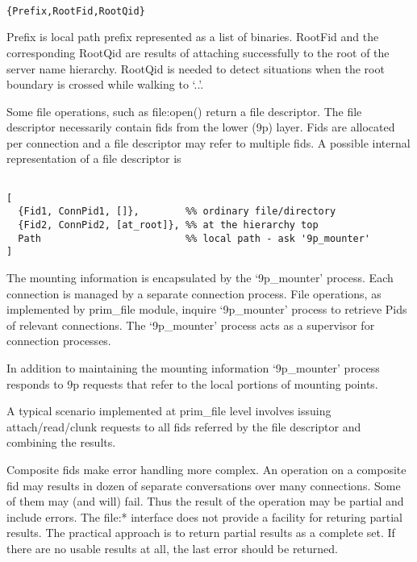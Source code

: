 \begin{adjustwidth}{2.5em}{2.5em}
\begin{verbatim}

{Prefix,RootFid,RootQid}

\end{verbatim}
\end{adjustwidth}

Prefix is local path prefix represented as a list of binaries. RootFid and the
corresponding RootQid are results of attaching successfully to the root of the
server name hierarchy. RootQid is needed to detect situations when the root
boundary is crossed while walking to `..'.

Some file operations, such as file:open() return a file descriptor. The
file descriptor necessarily contain fids from the lower (9p) layer. Fids are
allocated per connection and a file descriptor may refer to multiple fids. A
possible internal representation of a file descriptor is

\begin{adjustwidth}{2.5em}{2.5em}
\begin{verbatim}

[
  {Fid1, ConnPid1, []},        %% ordinary file/directory
  {Fid2, ConnPid2, [at_root]}, %% at the hierarchy top
  Path                         %% local path - ask '9p_mounter'
]

\end{verbatim}
\end{adjustwidth}

The mounting information is encapsulated by the `9p\_mounter' process. Each
connection is managed by a separate connection process. File operations, as
implemented by prim\_file module, inquire `9p\_mounter' process to retrieve Pids
of relevant connections. The `9p\_mounter' process acts as a supervisor for
connection processes.

In addition to maintaining the mounting information `9p\_mounter' process
responds to 9p requests that refer to the local portions of mounting points.

A typical scenario implemented at prim\_file level involves issuing
attach\slash read\slash clunk requests to all fids referred by the file descriptor and
combining the results.

Composite fids make error handling more complex. An operation on a composite fid
may results in dozen of separate conversations over many connections. Some of
them may (and will) fail. Thus the result of the operation may be partial and
include errors. The file:* interface does not provide a facility for
returing partial results. The practical approach is to return partial results as
a complete set. If there are no usable results at all, the last error should be
returned.

